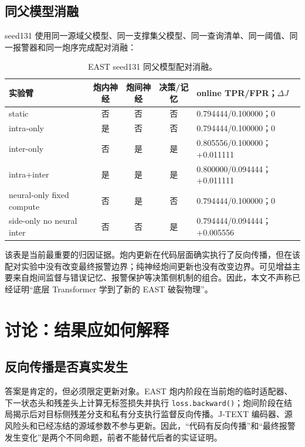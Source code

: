 \documentclass[11pt,a4paper]{article}
\newcommand{\code}[1]{\texttt{\small #1}}
\begin{document}
\subsection{同父模型消融}

seed131 使用同一源域父模型、同一支撑集父模型、同一查询清单、同一阈值、同一报警器和同一炮序完成配对消融：

\begin{table}[H]
\centering
\caption{EAST seed131 同父模型配对消融。}
\small
\begin{tabularx}{\textwidth}{l c c c Y}
\toprule
实验臂 & 炮内神经 & 炮间神经 & 决策/记忆 & online TPR/FPR；\(\Delta J\)\\
\midrule
static & 否 & 否 & 否 & 0.794444/0.100000；0\\
intra-only & 是 & 否 & 否 & 0.794444/0.100000；0\\
inter-only & 否 & 是 & 是 & 0.805556/0.100000；+0.011111\\
intra+inter & 是 & 是 & 是 & 0.800000/0.094444；+0.011111\\
neural-only fixed compute & 否 & 是 & 否 & 0.794444/0.100000；0\\
side-only no neural inter & 否 & 否 & 是 & 0.794444/0.094444；+0.005556\\
\bottomrule
\end{tabularx}
\end{table}

该表是当前最重要的归因证据。炮内更新在代码层面确实执行了反向传播，但在该配对实验中没有改变最终报警边界；纯神经炮间更新也没有改变边界。可见增益主要来自炮间监督与错误记忆、报警保护等决策侧机制的组合。因此，本文不声称已经证明“底层 Transformer 学到了新的 EAST 破裂物理”。

\section{讨论：结果应如何解释}

\subsection{反向传播是否真实发生}

答案是肯定的，但必须限定更新对象。EAST 炮内阶段在当前炮的临时适配器、下一状态头和残差头上计算无标签损失并执行 \code{loss.backward()}；炮间阶段在结局揭示后对目标侧残差分支和私有分支执行监督反向传播。J-TEXT 编码器、源风险头和已经冻结的源域参数不参与更新。因此，“代码有反向传播”和“最终报警发生变化”是两个不同命题，前者不能替代后者的实证证明。
\end{document}
